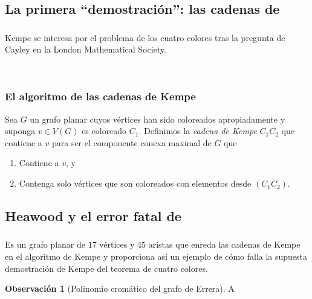 \documentclass[spanish, utf8,handout]{beamer} %
\theoremstyle{definition}
\newtheorem{remark}{Observación}
\begin{document}
\subsection{La primera ``demostración'': las cadenas de \citeauthor{kempe}}

\begin{frame}\transblindsvertical
\frametitle{\insertsubsection}

Kempe se interesa por el problema de los cuatro colores tras la pregunta de Cayley en la London Mathematical Society.

\


\end{frame}

\begin{frame}
\frametitle{El algoritmo de las cadenas de Kempe}

\begin{definition}
Sea $G$ un grafo planar cuyos vértices han sido coloreados apropiadamente y suponga $v\in V(G)$ es coloreado $C_1$. Definimos la \emph{cadena de Kempe} $C_1C_2$ que contiene a $v$ para ser el componente conexa maximal de $G$ que
\begin{enumerate}%
	\item Contiene a $v$, y
	\item Contenga solo vértices que son coloreados con elementos desde $(C_1C_2)$.
\end{enumerate}
\end{definition}
\end{frame}

\subsection{Heawood y el error fatal de \citeauthor{kempe}}

\begin{frame}[allowframebreaks]
\frametitle{\insertsubsection}

\begin{example}
Es un grafo planar de $17$ vértices y $45$ aristas que enreda las cadenas de Kempe en el algoritmo de Kempe y proporciona así un ejemplo de cómo falla la supuesta demostración de Kempe del teorema de cuatro colores.
\end{example}


\begin{remark}[Polinomio cromático del grafo de Errera]
A
\end{remark}
\end{frame}
\end{document}
